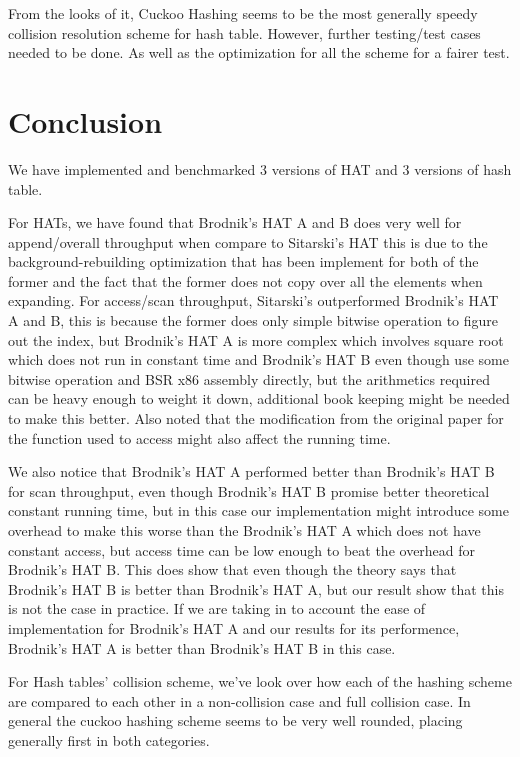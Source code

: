 \documentclass{article} %
\begin{document}
    From the looks of it, Cuckoo Hashing seems to be the most generally speedy collision resolution scheme for hash table.
    However, further testing/test cases needed to be done.
    As well as the optimization for all the scheme for a fairer test.

    \section*{Conclusion}
    We have implemented and benchmarked 3 versions of HAT and 3 versions of hash table.

    For HATs, we have found that Brodnik's HAT A and B does very well for append/overall throughput when compare to Sitarski's HAT this is due to
    the background-rebuilding optimization that has been implement for both of the former and the fact that the former does not copy over all the elements
    when expanding. For access/scan throughput, Sitarski's outperformed Brodnik's HAT A and B, this is because the former does only simple bitwise operation to figure out the index,
    but Brodnik's HAT A is more complex which involves square root which does not run in constant time and Brodnik's HAT B even though use some bitwise operation and BSR x86 assembly directly, but
    the arithmetics required can be heavy enough to weight it down, additional book keeping might be needed to make this better. Also noted that the modification from
    the original paper for the function used to access might also affect the running time.

    We also notice that Brodnik's HAT A performed better than Brodnik's HAT B for scan throughput, even though Brodnik's HAT B promise better theoretical constant running time, but in this
    case our implementation might introduce some overhead to make this worse than the Brodnik's HAT A which does not have constant access, but access time can be low enough to beat the overhead for
    Brodnik's HAT B. This does show that even though the theory says that Brodnik's HAT B is better than Brodnik's HAT A, but our result show that this is not the case in practice.
    If we are taking in to account the ease of implementation for Brodnik's HAT A and our results for its performence, Brodnik's HAT A is better than Brodnik's HAT B in this case.

    For Hash tables' collision scheme, we've look over how each of the hashing scheme are compared to each other in a non-collision case and full collision case.
    In general the cuckoo hashing scheme seems to be very well rounded, placing generally first in both categories.
\end{document}
